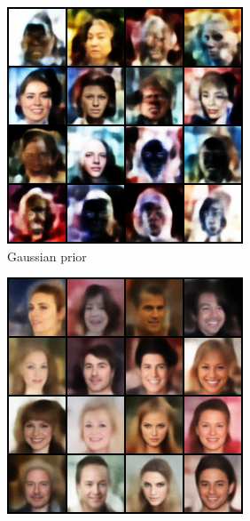 \documentclass{article}
\begin{document}
\begin{figure}
\begin{subfigure}{.33\textwidth}
    \includegraphics[width=.99\textwidth]{figures/classical_celeba.png}
    \caption{Gaussian prior}\label{fig:celeba_classical}
    \end{subfigure}
    \begin{subfigure}{.33\textwidth}
    \includegraphics[width=.99\textwidth]{figures/NF_celeba.png}

\end{subfigure}
\end{figure}
\end{document}
